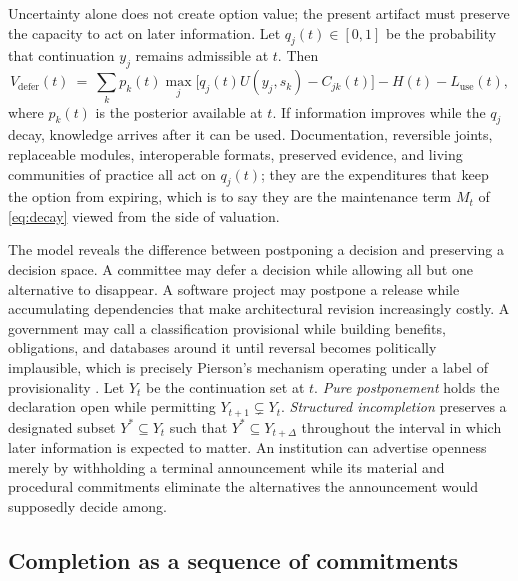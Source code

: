 Uncertainty alone does not create option value; the present artifact must preserve the capacity to act on later information. Let $q_j(t)\in[0,1]$ be the probability that continuation $y_j$ remains admissible at $t$. Then
\begin{equation}\label{eq:defer-decay}
V_{\mathrm{defer}}(t)\ =\ \sum_kp_k(t)\max_j\big[q_j(t)U(y_j,s_k)-C_{jk}(t)\big]-H(t)-L_{\mathrm{use}}(t),
\end{equation}
where $p_k(t)$ is the posterior available at $t$. If information improves while the $q_j$ decay, knowledge arrives after it can be used. Documentation, reversible joints, replaceable modules, interoperable formats, preserved evidence, and living communities of practice all act on $q_j(t)$; they are the expenditures that keep the option from expiring, which is to say they are the maintenance term $M_t$ of \eqref{eq:decay} viewed from the side of valuation.

The model reveals the difference between postponing a decision and preserving a decision space. A committee may defer a decision while allowing all but one alternative to disappear. A software project may postpone a release while accumulating dependencies that make architectural revision increasingly costly. A government may call a classification provisional while building benefits, obligations, and databases around it until reversal becomes politically implausible, which is precisely Pierson's mechanism operating under a label of provisionality \cite{pierson2000}. Let $Y_t$ be the continuation set at $t$. \emph{Pure postponement} holds the declaration open while permitting $Y_{t+1}\subsetneq Y_t$. \emph{Structured incompletion} preserves a designated subset $Y^\ast\subseteq Y_t$ such that $Y^\ast\subseteq Y_{t+\Delta}$ throughout the interval in which later information is expected to matter. An institution can advertise openness merely by withholding a terminal announcement while its material and procedural commitments eliminate the alternatives the announcement would supposedly decide among.

\subsection{Completion as a sequence of commitments}

